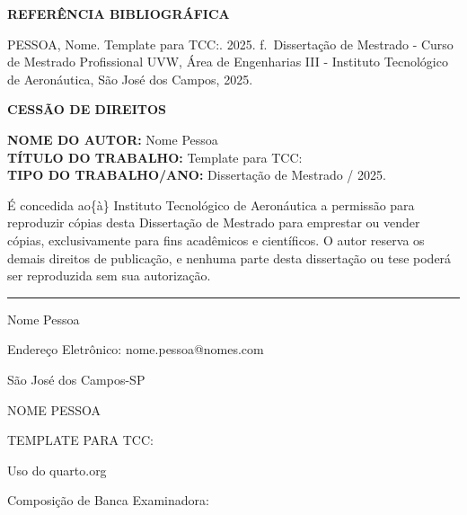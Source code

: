 \documentclass[
  12pt,
  oneside,
  a4paper,
  english,
  brazil]{abntex2}
\begin{document}
\textbf{REFERÊNCIA BIBLIOGRÁFICA}

\uppercase{ Pessoa}, Nome. Template para TCC:. 2025. \pageref{LastPage}
f.~Dissertação de Mestrado - Curso de Mestrado Profissional UVW, Área de
Engenharias III - Instituto Tecnológico de Aeronáutica, São José dos
Campos, 2025.

\vfill

\textbf{CESSÃO DE DIREITOS}

\textbf{NOME DO AUTOR:} Nome Pessoa\\
\textbf{TÍTULO DO TRABALHO:} Template para TCC:\\
\textbf{TIPO DO TRABALHO/ANO:} Dissertação de Mestrado / 2025.

É concedida ao\{à\} Instituto Tecnológico de Aeronáutica a permissão
para reproduzir cópias desta Dissertação de Mestrado para emprestar ou
vender cópias, exclusivamente para fins acadêmicos e científicos. O
autor reserva os demais direitos de publicação, e nenhuma parte desta
dissertação ou tese poderá ser reproduzida sem sua autorização.

\vspace{1cm}

\begin{center}\rule{0.5\linewidth}{0.5pt}\end{center}

Nome Pessoa

Endereço Eletrônico: nome.pessoa@nomes.com

São José dos Campos-SP

\newpage{}

\begin{center}

\uppercase{ Nome Pessoa }

\vfill

\begin{center}
  \uppercase{ Template para TCC: }

  Uso do quarto.org


\end{center}

\end{center}

\vfill

Composição de Banca Examinadora:
\end{document}
